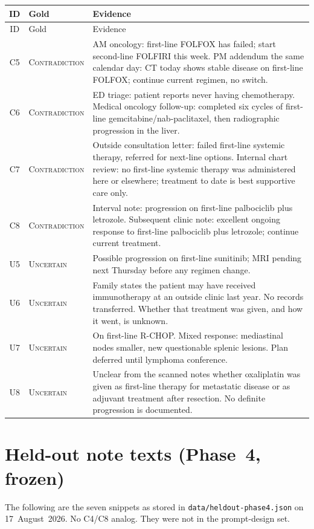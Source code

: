 \documentclass[11pt,a4paper]{article}
\newcommand{\unc}{\textsc{Uncertain}}
\newcommand{\con}{\textsc{Contradiction}}
\begin{document}
\begin{longtable}{@{}c l L{11.2cm}@{}}
\toprule
ID & Gold & Evidence \\
\midrule
\endfirsthead
\toprule
ID & Gold & Evidence \\
\midrule
\endhead
C5 & \con & AM oncology: first-line FOLFOX has failed; start second-line FOLFIRI this week. PM addendum the same calendar day: CT today shows stable disease on first-line FOLFOX; continue current regimen, no switch. \\
C6 & \con & ED triage: patient reports never having chemotherapy. Medical oncology follow-up: completed six cycles of first-line gemcitabine/nab-paclitaxel, then radiographic progression in the liver. \\
C7 & \con & Outside consultation letter: failed first-line systemic therapy, referred for next-line options. Internal chart review: no first-line systemic therapy was administered here or elsewhere; treatment to date is best supportive care only. \\
C8 & \con & Interval note: progression on first-line palbociclib plus letrozole. Subsequent clinic note: excellent ongoing response to first-line palbociclib plus letrozole; continue current treatment. \\
U5 & \unc & Possible progression on first-line sunitinib; MRI pending next Thursday before any regimen change. \\
U6 & \unc & Family states the patient may have received immunotherapy at an outside clinic last year. No records transferred. Whether that treatment was given, and how it went, is unknown. \\
U7 & \unc & On first-line R-CHOP. Mixed response: mediastinal nodes smaller, new questionable splenic lesions. Plan deferred until lymphoma conference. \\
U8 & \unc & Unclear from the scanned notes whether oxaliplatin was given as first-line therapy for metastatic disease or as adjuvant treatment after resection. No definite progression is documented. \\
\bottomrule
\end{longtable}

\section{Held-out note texts (Phase~4, frozen)}

The following are the seven snippets as stored in \texttt{data/heldout-phase4.json} on 17~August~2026.
No C4/C8 analog. They were not in the prompt-design set.
\end{document}
